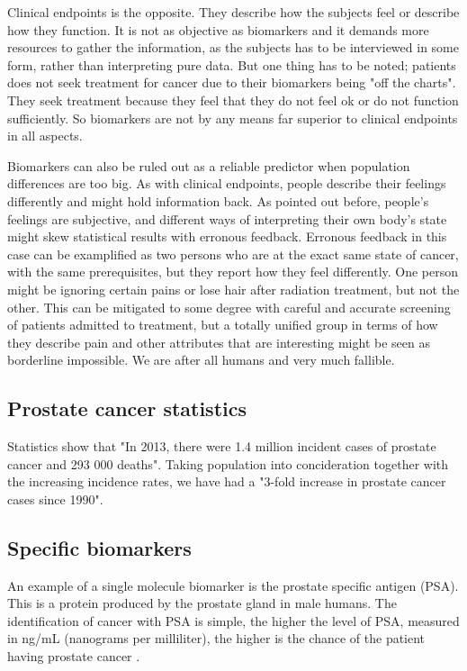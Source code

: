 Clinical endpoints is the opposite\cite{biomarker3}. They describe how the
subjects feel or describe how they function. It is not as objective as
biomarkers and it demands more resources to gather the information, as the
subjects has to be interviewed in some form, rather than interpreting pure data.
But one thing has to be noted; patients does not seek treatment for cancer due
to their biomarkers being "off the charts". They seek treatment because they
feel that they do not feel ok or do not function sufficiently. So biomarkers are
not by any means far superior to clinical endpoints in all aspects.

Biomarkers can also be ruled out as a reliable predictor when population
differences are too big\cite{biomarker3}. As with clinical endpoints, people
describe their feelings differently and might hold information back. As pointed
out before, people's feelings are subjective, and different ways of interpreting
their own body's state might skew statistical results with erronous feedback.
Erronous feedback in this case can be examplified as two persons who are at the
exact same state of cancer, with the same prerequisites, but they report how
they feel differently. One person might be ignoring certain pains or lose hair
after radiation treatment, but not the other. This can be mitigated to some
degree with careful and accurate screening of patients admitted to treatment,
but a totally unified group in terms of how they describe pain and other
attributes that are interesting might be seen as borderline impossible. We are
after all humans and very much fallible.

\subsection{Prostate cancer statistics}
Statistics show that "In 2013, there were 1.4 million incident cases of prostate
cancer and 293 000 deaths"\cite{cancerburden2}. Taking population into
concideration together with the increasing incidence rates, we have had
a "3-fold increase in prostate cancer cases since 1990"\cite{cancerburden2}. 

\subsection{Specific biomarkers}
An example of a single molecule biomarker is the prostate specific antigen
(PSA). This is a protein produced by the prostate gland in male humans. The
identification of cancer with PSA is simple, the higher the level of PSA,
measured in ng/mL (nanograms per milliliter), the higher is the chance of the
patient having prostate cancer \cite{cancerfacts}.

